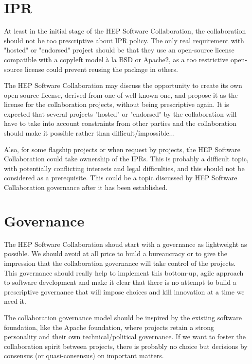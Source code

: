 \documentclass[11pt]{article} %
\begin{document}
\section{IPR}

At least in the initial stage of the HEP Software Collaboration, the collaboration should not be too prescriptive about IPR policy.
The only real requirement with "hosted" or "endorsed" project should be that they use an open-source license compatible with a
copyleft model à la BSD or Apache2, as a too restrictive open-source license could prevent reusing the package in others.

The HEP Software Collaboration may discuss the opportunity to create its own open-source license, derived from one of well-known one,
and propose it as the license for the collaboration projects, without being prescriptive again. It is expected that several projects
"hosted" or "endorsed" by the collaboration will have to take into account constraints from other parties and the collaboration should
make it possible rather than difficult/impossible... 

Also, for some flagship projects or when request by projects, the HEP Software Collaboration could take ownership of the IPRs. This
is probably a difficult topic, with potentially conflicting interests and legal difficulties, and this should not be considered as a 
prerequisite. This could be a topic discussed by HEP Software Collaboration governance after it has been established.


\section{Governance}

The HEP Software Collaboration shoud start with a governance as lightweight as possible. We should avoid at all price to build
a bureaucracy or to give the impression that the collaboration governance will take control of the projects. This governance should
really help to implement this bottom-up, agile approach to software development and make it clear that there is no attempt to
build a prescriptive governance that will impose choices and kill innovation at a time we need it.

The collaboration governance model should be inspired by the existing software foundation, like the Apache foundation, where projects
retain a strong personality and their own technical/political governance. If we want to foster the collaboration spirit between projects,
there is probably no choice but decisions by consensus (or quasi-consensus) on important matters.
\end{document}
